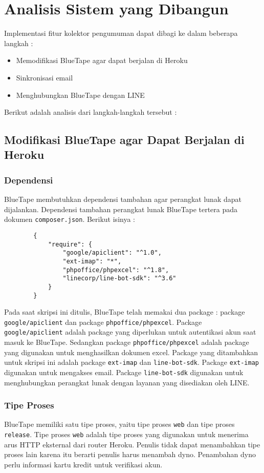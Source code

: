 \section{Analisis Sistem yang Dibangun}
\label{sec:analisisYangDibangun}
	Implementasi fitur kolektor pengumuman dapat dibagi ke dalam beberapa langkah :
\begin{itemize}
	\item Memodifikasi BlueTape agar dapat berjalan di Heroku
	\item Sinkronisasi email
	\item Menghubungkan BlueTape dengan LINE
\end{itemize}
	Berikut adalah analisis dari langkah-langkah tersebut :
\subsection{Modifikasi BlueTape agar Dapat Berjalan di Heroku}
	\subsubsection{Dependensi}
		BlueTape membutuhkan dependensi tambahan agar perangkat lunak dapat dijalankan. Dependensi tambahan perangkat lunak BlueTape tertera pada dokumen \texttt{composer.json}. Berikut isinya :
		\begin{lstlisting}
		{
		    "require": {
		        "google/apiclient": "^1.0",
				"ext-imap": "*",
		        "phpoffice/phpexcel": "^1.8",
		        "linecorp/line-bot-sdk": "^3.6"
		    }
		}
		\end{lstlisting}
		
		Pada saat skripsi ini ditulis, BlueTape telah memakai dua package : package \texttt{google/apiclient} dan package \texttt{phpoffice/phpexcel}. Package \texttt{google/apiclient} adalah package yang diperlukan untuk autentikasi akun saat masuk ke BlueTape. Sedangkan package \texttt{phpoffice/phpexcel} adalah package yang digunakan untuk menghasilkan dokumen excel. Package yang ditambahkan untuk skripsi ini adalah package \texttt{ext-imap} dan \texttt{line-bot-sdk}. Package \texttt{ext-imap} digunakan untuk mengakses email. Package \texttt{line-bot-sdk} digunakan untuk menghubungkan perangkat lunak dengan layanan yang disediakan oleh LINE.
		
	\subsubsection{Tipe Proses}
		BlueTape memiliki satu tipe proses, yaitu tipe proses \texttt{web} dan tipe proses \texttt{release}. Tipe proses \texttt{web} adalah tipe proses yang digunakan untuk menerima arus HTTP eksternal dari router Heroku. Penulis tidak dapat menambahkan tipe proses lain karena itu berarti penulis harus menambah dyno. Penambahan dyno perlu informasi kartu kredit untuk verifikasi akun.
		

